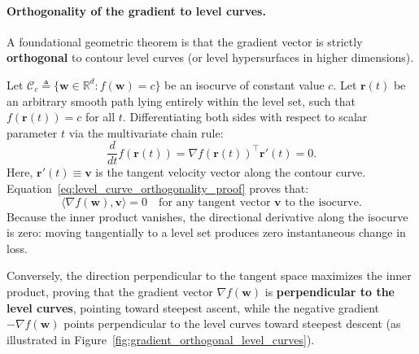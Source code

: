 \paragraph{Orthogonality of the gradient to level curves.}
A foundational geometric theorem is that the gradient vector is strictly \textbf{orthogonal} to contour level curves (or level hypersurfaces in higher dimensions).

Let $\mathcal{C}_c \triangleq \{ \mathbf{w} \in \mathbb{R}^d : f(\mathbf{w}) = c \}$ be an isocurve of constant value $c$. Let $\mathbf{r}(t)$ be an arbitrary smooth path lying entirely within the level set, such that $f(\mathbf{r}(t)) = c$ for all $t$. Differentiating both sides with respect to scalar parameter $t$ via the multivariate chain rule:
\begin{equation}
\frac{d}{dt} f(\mathbf{r}(t)) = \nabla f(\mathbf{r}(t))^\top \mathbf{r}'(t) = 0.
\label{eq:level_curve_orthogonality_proof}
\end{equation}
Here, $\mathbf{r}'(t) \equiv \mathbf{v}$ is the tangent velocity vector along the contour curve. Equation~\eqref{eq:level_curve_orthogonality_proof} proves that:
\begin{equation}
\langle \nabla f(\mathbf{w}), \mathbf{v} \rangle = 0 \quad \text{for any tangent vector } \mathbf{v} \text{ to the isocurve}.
\end{equation}
Because the inner product vanishes, the directional derivative along the isocurve is zero: moving tangentially to a level set produces zero instantaneous change in loss. 

Conversely, the direction perpendicular to the tangent space maximizes the inner product, proving that the gradient vector $\nabla f(\mathbf{w})$ is \textbf{perpendicular to the level curves}, pointing toward steepest ascent, while the negative gradient $-\nabla f(\mathbf{w})$ points perpendicular to the level curves toward steepest descent (as illustrated in Figure~\ref{fig:gradient_orthogonal_level_curves}).

